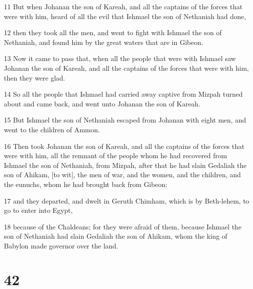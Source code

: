 \par 11 But when Johanan the son of Kareah, and all the captains of the forces that were with him, heard of all the evil that Ishmael the son of Nethaniah had done,
\par 12 then they took all the men, and went to fight with Ishmael the son of Nethaniah, and found him by the great waters that are in Gibeon.
\par 13 Now it came to pass that, when all the people that were with Ishmael saw Johanan the son of Kareah, and all the captains of the forces that were with him, then they were glad.
\par 14 So all the people that Ishmael had carried away captive from Mizpah turned about and came back, and went unto Johanan the son of Kareah.
\par 15 But Ishmael the son of Nethaniah escaped from Johanan with eight men, and went to the children of Ammon.
\par 16 Then took Johanan the son of Kareah, and all the captains of the forces that were with him, all the remnant of the people whom he had recovered from Ishmael the son of Nethaniah, from Mizpah, after that he had slain Gedaliah the son of Ahikam, [to wit], the men of war, and the women, and the children, and the eunuchs, whom he had brought back from Gibeon:
\par 17 and they departed, and dwelt in Geruth Chimham, which is by Beth-lehem, to go to enter into Egypt,
\par 18 because of the Chaldeans; for they were afraid of them, because Ishmael the son of Nethaniah had slain Gedaliah the son of Ahikam, whom the king of Babylon made governor over the land.

\chapter{42}

